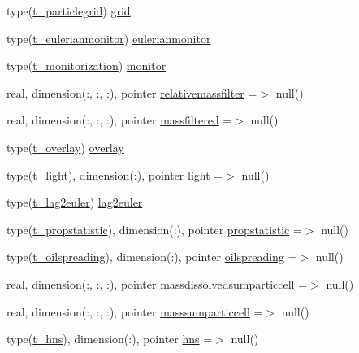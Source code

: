 \begin{DoxyCompactItemize}
type(\mbox{\hyperlink{structmodulelagrangianglobal_1_1t__particlegrid}{t\+\_\+particlegrid}}) \mbox{\hyperlink{structmodulelagrangianglobal_1_1t__eulermodel_a2bb07b86b064dad99a0662a07f013d1a}{grid}}
\item 
type(\mbox{\hyperlink{structmodulelagrangianglobal_1_1t__eulerianmonitor}{t\+\_\+eulerianmonitor}}) \mbox{\hyperlink{structmodulelagrangianglobal_1_1t__eulermodel_a2eb1bd12742030730e74b92b4f0286ba}{eulerianmonitor}}
\item 
type(\mbox{\hyperlink{structmodulelagrangianglobal_1_1t__monitorization}{t\+\_\+monitorization}}) \mbox{\hyperlink{structmodulelagrangianglobal_1_1t__eulermodel_a1be735134b3b0649e5465bfbc059185f}{monitor}}
\item 
real, dimension(\+:, \+:, \+:), pointer \mbox{\hyperlink{structmodulelagrangianglobal_1_1t__eulermodel_a5a7fbf16952ded61d72e0fc1fa1d70f8}{relativemassfilter}} =$>$ null()
\item 
real, dimension(\+:, \+:, \+:), pointer \mbox{\hyperlink{structmodulelagrangianglobal_1_1t__eulermodel_aa4b942ab40def4f6b8a68636e85b16fd}{massfiltered}} =$>$ null()
\item 
type(\mbox{\hyperlink{structmodulelagrangianglobal_1_1t__overlay}{t\+\_\+overlay}}) \mbox{\hyperlink{structmodulelagrangianglobal_1_1t__eulermodel_a58e9c69265c6ec553ad1d63e2f084647}{overlay}}
\item 
type(\mbox{\hyperlink{structmodulelagrangianglobal_1_1t__light}{t\+\_\+light}}), dimension(\+:), pointer \mbox{\hyperlink{structmodulelagrangianglobal_1_1t__eulermodel_a299f6e80f2806951d8051a6cc0408f2a}{light}} =$>$ null()
\item 
type(\mbox{\hyperlink{structmodulelagrangianglobal_1_1t__lag2euler}{t\+\_\+lag2euler}}) \mbox{\hyperlink{structmodulelagrangianglobal_1_1t__eulermodel_ac2dac360ded84e3b156070ebd3573f63}{lag2euler}}
\item 
type(\mbox{\hyperlink{structmodulelagrangianglobal_1_1t__propstatistic}{t\+\_\+propstatistic}}), dimension(\+:), pointer \mbox{\hyperlink{structmodulelagrangianglobal_1_1t__eulermodel_ae04db795e077d56db5def0561b3f82a9}{propstatistic}} =$>$ null()
\item 
type(\mbox{\hyperlink{structmodulelagrangianglobal_1_1t__oilspreading}{t\+\_\+oilspreading}}), dimension(\+:), pointer \mbox{\hyperlink{structmodulelagrangianglobal_1_1t__eulermodel_af1be81dfc9e262b2cb84a58f98d6e3da}{oilspreading}} =$>$ null()
\item 
real, dimension(\+:, \+:, \+:), pointer \mbox{\hyperlink{structmodulelagrangianglobal_1_1t__eulermodel_adb9ff28c0447e4ceb31fd3bc31547486}{massdissolvedsumparticcell}} =$>$ null()
\item 
real, dimension(\+:, \+:, \+:), pointer \mbox{\hyperlink{structmodulelagrangianglobal_1_1t__eulermodel_a4c90fee01e4075d27b149cbf5a77de18}{masssumparticcell}} =$>$ null()
\item 
type(\mbox{\hyperlink{structmodulelagrangianglobal_1_1t__hns}{t\+\_\+hns}}), dimension(\+:), pointer \mbox{\hyperlink{structmodulelagrangianglobal_1_1t__eulermodel_ae95533aa0f64770698266ebabe54403b}{hns}} =$>$ null()
\end{DoxyCompactItemize}


